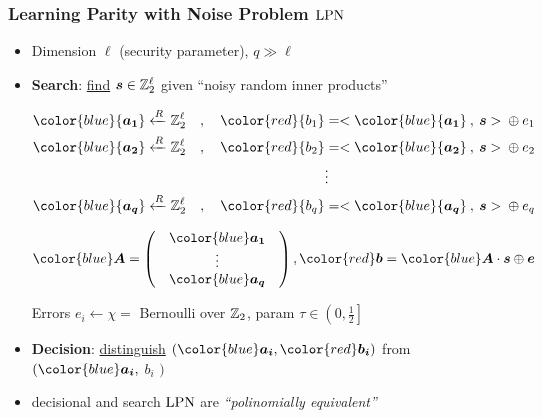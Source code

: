 \begin{frame}
\frametitle{Learning Parity with Noise Problem $\mathrm{LPN}$}
\begin{itemize}
 \item Dimension $\ell$ (security parameter), $q \gg \ell$
 \item \textbf{Search}: \underline{find}  $ \boldsymbol{s} \in \mathbb{Z}_2^{\ell}$ given ``noisy random inner products'' \\
 \begin{overprint}
 \begin{align*}
  {\color{blue}{\vect{a_1}}} \R \zol \quad , \quad {\color{red}{b_1}} &= <{\color{blue}{\vect{a_1}}} \: , \: \vect{s}> \: \xor \: e_1 \\
  {\color{blue}{\vect{a_2}}} \R \zol \quad, \quad  {\color{red}{b_2}} &= <{\color{blue}{\vect{a_2}}} \: , \: \vect{s}> \: \xor \: e_2 \\
   & \vdots \\
   {\color{blue}{\vect{a_q}}} \R \zol \quad, \quad  {\color{red}{b_q}} &= <{\color{blue}{\vect{a_q}}} \: , \: \vect{s}> \: \xor \: e_q \\
  \end{align*}

  \vspace*{25pt}
\[
{\color{blue} \vect{A}} = \begin{pmatrix}
            & {\color{blue}\vect{a_1}} & \\
            & \vdots  & \\ 
            & {\color{blue}\vect{a_q}} & 
           \end{pmatrix}  , {\color{red} \vect{b}} = {\color{blue} \vect{A}} \cdot \vect{s} \xor \vect{e} 
\]
 \end{overprint}
  Errors $e_i \gets \chi =$ Bernoulli over $\mathbb{Z}_2$, param $\tau \in \left( 0,\frac{1}{2} \right] $ 
 \item \textbf{Decision}: \underline{distinguish} $\left( {\color{blue}\vect{a_i}}, {\color{red}\vect{b_i}} \right)$ from {\color{blue}{uniform}} $( {\color{blue}\vect{a_i}}, $ {\color{blue} $b_i$} $)$
 \item decisional and search $\mathrm{LPN}$ are \emph{``polinomially equivalent''} \\ 
 \end{itemize}
\end{frame}


